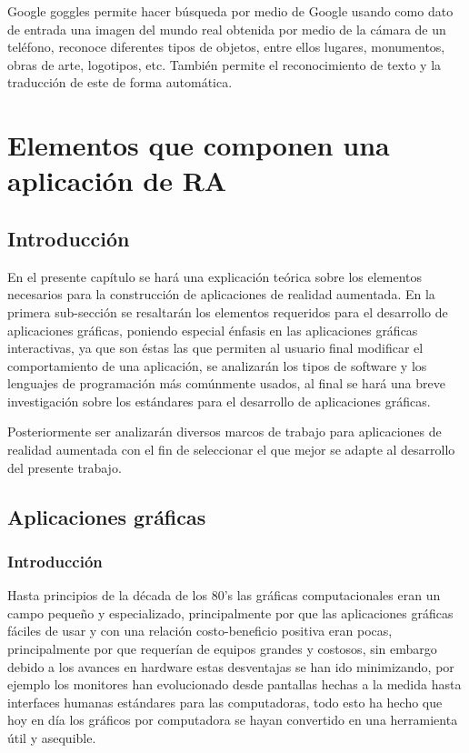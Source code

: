 \documentclass[12pt,a4paper,spanish,openany]{book}
\begin{document}
Google goggles permite hacer búsqueda por medio de Google usando como dato de
entrada una imagen del mundo real obtenida por medio de la cámara de un
teléfono, reconoce diferentes tipos de objetos, entre ellos lugares, monumentos,
obras de arte, logotipos, etc. También permite el reconocimiento de texto y la
traducción de este de forma automática.


\chapter{Elementos que componen una aplicación de RA}


\section{Introducción}

En el presente capítulo se hará una explicación teórica sobre los elementos
necesarios para la construcción de aplicaciones de realidad aumentada.
En la primera sub-sección se resaltarán los elementos requeridos para el
desarrollo de aplicaciones gráficas, poniendo especial énfasis en las
aplicaciones gráficas interactivas, ya que son éstas las que permiten al usuario
final modificar el comportamiento de una aplicación, se analizarán los tipos de
software y los lenguajes de programación más comúnmente usados, al final se hará una
breve investigación sobre los estándares para el desarrollo de aplicaciones
gráficas.

Posteriormente ser analizarán diversos marcos de trabajo para aplicaciones de
realidad aumentada con el fin de seleccionar el que mejor se adapte al
desarrollo del presente trabajo.


\section{Aplicaciones gráficas}



\subsection{Introducción}

Hasta principios de la década de los 80's las gráficas computacionales eran un
campo pequeño y especializado, principalmente por que las aplicaciones gráficas
fáciles de usar y con una relación costo-beneficio positiva eran pocas,
principalmente por que requerían de equipos  grandes y costosos, sin embargo
debido a los avances en hardware estas desventajas se han ido minimizando, por
ejemplo los monitores han evolucionado desde pantallas hechas a la medida hasta
interfaces humanas estándares para las computadoras, todo esto ha hecho que hoy
en día los gráficos por computadora se hayan convertido en una herramienta útil
y asequible.
\end{document}
